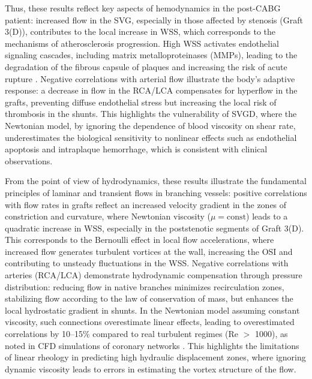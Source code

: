 ﻿\documentclass[12pt,a4paper]{article}
\newcounter{subsubsubsection}[subsubsection]
\theoremstyle{definition}
\numberwithin{equation}{section}
\begin{document}
Thus, these results reflect key aspects of hemodynamics in the post-CABG patient: increased flow in the SVG, especially in those affected by stenosis (Graft 3(D)), contributes to the local increase in WSS, which corresponds to the mechanisms of atherosclerosis progression. High WSS activates endothelial signaling cascades, including matrix metalloproteinases (MMPs), leading to the degradation of the fibrous capsule of plaques and increasing the risk of acute rupture \cite{10.1093/rb/rbw021}. Negative correlations with arterial flow illustrate the body's adaptive response: a decrease in flow in the RCA/LCA compensates for hyperflow in the grafts, preventing diffuse endothelial stress but increasing the local risk of thrombosis in the shunts. This highlights the vulnerability of SVGD, where the Newtonian model, by ignoring the dependence of blood viscosity on shear rate, underestimates the biological sensitivity to nonlinear effects such as endothelial apoptosis and intraplaque hemorrhage, which is consistent with clinical observations.

From the point of view of hydrodynamics, these results illustrate the fundamental principles of laminar and transient flows in branching vessels: positive correlations with flow rates in grafts reflect an increased velocity gradient in the zones of constriction and curvature, where Newtonian viscosity ($\mu = \text{const}$) leads to a quadratic increase in WSS, especially in the poststenotic segments of Graft 3(D). This corresponds to the Bernoulli effect in local flow accelerations, where increased flow generates turbulent vortices at the wall, increasing the OSI and contributing to unsteady fluctuations in the WSS. Negative correlations with arteries (RCA/LCA) demonstrate hydrodynamic compensation through pressure distribution: reducing flow in native branches minimizes recirculation zones, stabilizing flow according to the law of conservation of mass, but enhances the local hydrostatic gradient in shunts. In the Newtonian model assuming constant viscosity, such connections overestimate linear effects, leading to overestimated correlations by 10--15\% compared to real turbulent regimes (Re $>$ 1000), as noted in CFD simulations of coronary networks \cite{10.1016/j.ijnonlinmec.2020.103477}. This highlights the limitations of linear rheology in predicting high hydraulic displacement zones, where ignoring dynamic viscosity leads to errors in estimating the vortex structure of the flow.
 


\end{document}
